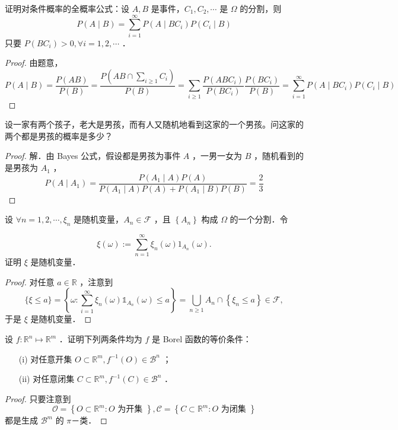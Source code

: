 \begin{exercise}
    证明对条件概率的全概率公式：设 $A, B$ 是事件，$C_1, C_2, \cdots$ 是 $\Omega$ 的分割，则
    $$
        P(A \mid B)=\sum_{i=1}^{\infty} P\left(A \mid B C_i\right) P\left(C_i \mid B\right)
    $$
    只要 $P\left(B C_i\right)>0, \forall i=1,2, \cdots$ ．
\end{exercise}
\begin{proof}
    由题意，
    $$
        P(A \mid B)=\frac{P(A B)}{P(B)}=\frac{P\left(A B \cap \sum_{i \geq 1} C_i\right)}{P(B)}=\sum_{i \geq 1} \frac{P\left(A B C_i\right)}{P\left(B C_i\right)} \frac{P\left(B C_i\right)}{P(B)}=\sum_{i=1}^{\infty} P\left(A \mid B C_i\right) P\left(C_i \mid B\right)
    $$
\end{proof}
\begin{exercise}
    设一家有两个孩子，老大是男孩，而有人又随机地看到这家的一个男孩。问这家的两个都是男孩的概率是多少？
\end{exercise}
\begin{proof}
    解．由 Bayes 公式，假设都是男孩为事件 $A$ ，一男一女为 $B$ ，随机看到的是男孩为 $A_1$ ，
    $$
        P\left(A \mid A_1\right)=\frac{P\left(A_1 \mid A\right) P(A)}{P\left(A_1 \mid A\right) P(A)+P\left(A_1 \mid B\right) P(B)}=\frac{2}{3}
    $$
\end{proof}
\begin{exercise}
    设 $\forall n=1,2, \cdots, \xi_n$ 是随机变量，$A_n \in \mathscr{F}$ ，且 $\left\{A_n\right\}$ 构成 $\Omega$ 的一个分割．令

    $$
        \xi(\omega):=\sum_{n=1}^{\infty} \xi_n(\omega) 1_{A_n}(\omega) .
    $$
    证明 $\xi$ 是随机变量．
\end{exercise}
\begin{proof}
    对任意 $a \in \mathbb{R}$ ，注意到
    $$
        \{\xi \leq a\}=\left\{\omega: \sum_{i=1}^{\infty} \xi_n(\omega) \mathbb{1}_{A_n}(\omega) \leq a\right\}=\bigcup_{n \geq 1} A_n \cap\left\{\xi_n \leq a\right\} \in \mathscr{F},
    $$
    于是 $\xi$ 是随机变量．
\end{proof}
\begin{exercise}
    设 $f: \mathbb{R}^n \mapsto \mathbb{R}^m$ ．证明下列两条件均为 $f$ 是 Borel 函数的等价条件：
    \begin{enumerate}
        \item[(i)] 对任意开集 $O \subset \mathbb{R}^m, f^{-1}(O) \in \mathscr{B}^n$ ；
        \item[(ii)] 对任意闭集 $C \subset \mathbb{R}^m, f^{-1}(C) \in \mathscr{B}^n$ ．
    \end{enumerate}
\end{exercise}
\begin{proof}
    只要注意到
    $$
        \mathscr{O}=\left\{O \subset \mathbb{R}^m: O \text { 为开集 }\right\}, \mathscr{C}=\left\{C \subset \mathbb{R}^m: O \text { 为闭集 }\right\}
    $$
    都是生成 $\mathscr{B}^m$ 的 $\pi$－类．
\end{proof}

